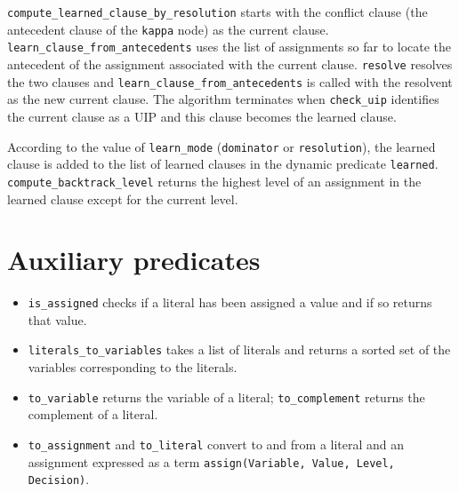 \documentclass[11pt]{article}
\newcommand*{\p}[1]{\textup{\texttt{#1}}}
\begin{document}
\p{compute\_learned\_clause\_by\_resolution} starts with the conflict
clause (the antecedent clause of the \p{kappa} node) as the current
clause. \p{learn\_clause\_from\_antecedents} uses the list of
assignments so far to locate the antecedent of the assignment associated
with the current clause. \p{resolve} resolves the two clauses and
\p{learn\_clause\_from\_antecedents} is called with the resolvent as the
new current clause. The algorithm terminates when \p{check\_uip}
identifies the current clause as a UIP and this clause becomes the
learned clause.

According to the value of \p{learn\_mode} (\p{dominator} or
\p{resolution}), the learned clause is added to the list of learned
clauses in the dynamic predicate \p{learned}.
\p{compute\_backtrack\_level} returns the highest level of an assignment
in the learned clause except for the current level.


\section{Auxiliary predicates}\label{s.aux}

\begin{itemize}

\item \p{is\_assigned} checks if a literal has been assigned a value
and if so returns that value.

\item \p{literals\_to\_variables} takes a list of literals and returns a
sorted set of the variables corresponding to the literals.

\item \p{to\_variable} returns the variable of a literal;
\p{to\_complement} returns the complement of a literal.

\item \p{to\_assignment} and \p{to\_literal} convert to and from a
literal and an assignment expressed as a term \p{assign(Variable, Value,
Level, Decision)}.

\end{itemize}




\end{document}
